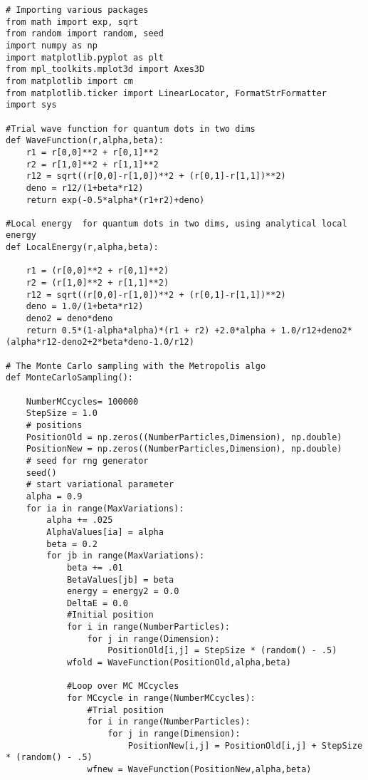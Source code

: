 \documentclass[%
oneside,                 %
final,                   %
10pt]{article}
\begin{document}
\begin{verbatim}
# Importing various packages
from math import exp, sqrt
from random import random, seed
import numpy as np
import matplotlib.pyplot as plt
from mpl_toolkits.mplot3d import Axes3D
from matplotlib import cm
from matplotlib.ticker import LinearLocator, FormatStrFormatter
import sys

#Trial wave function for quantum dots in two dims
def WaveFunction(r,alpha,beta):
    r1 = r[0,0]**2 + r[0,1]**2
    r2 = r[1,0]**2 + r[1,1]**2
    r12 = sqrt((r[0,0]-r[1,0])**2 + (r[0,1]-r[1,1])**2)
    deno = r12/(1+beta*r12)
    return exp(-0.5*alpha*(r1+r2)+deno)

#Local energy  for quantum dots in two dims, using analytical local energy
def LocalEnergy(r,alpha,beta):
    
    r1 = (r[0,0]**2 + r[0,1]**2)
    r2 = (r[1,0]**2 + r[1,1]**2)
    r12 = sqrt((r[0,0]-r[1,0])**2 + (r[0,1]-r[1,1])**2)
    deno = 1.0/(1+beta*r12)
    deno2 = deno*deno
    return 0.5*(1-alpha*alpha)*(r1 + r2) +2.0*alpha + 1.0/r12+deno2*(alpha*r12-deno2+2*beta*deno-1.0/r12)

# The Monte Carlo sampling with the Metropolis algo
def MonteCarloSampling():

    NumberMCcycles= 100000
    StepSize = 1.0
    # positions
    PositionOld = np.zeros((NumberParticles,Dimension), np.double)
    PositionNew = np.zeros((NumberParticles,Dimension), np.double)
    # seed for rng generator
    seed()
    # start variational parameter
    alpha = 0.9
    for ia in range(MaxVariations):
        alpha += .025
        AlphaValues[ia] = alpha
        beta = 0.2 
        for jb in range(MaxVariations):
            beta += .01
            BetaValues[jb] = beta
            energy = energy2 = 0.0
            DeltaE = 0.0
            #Initial position
            for i in range(NumberParticles):
                for j in range(Dimension):
                    PositionOld[i,j] = StepSize * (random() - .5)
            wfold = WaveFunction(PositionOld,alpha,beta)

            #Loop over MC MCcycles
            for MCcycle in range(NumberMCcycles):
                #Trial position
                for i in range(NumberParticles):
                    for j in range(Dimension):
                        PositionNew[i,j] = PositionOld[i,j] + StepSize * (random() - .5)
                wfnew = WaveFunction(PositionNew,alpha,beta)


\end{verbatim}
\end{document}
